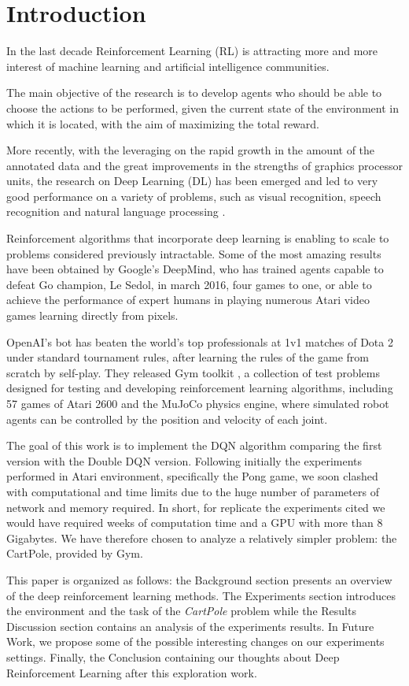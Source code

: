 \section{Introduction}

In the last decade Reinforcement Learning (RL) is attracting more and more interest of machine learning and artificial intelligence communities.

The main objective of the research is to develop agents who should be able to choose the actions to be performed, given the current state of the environment in which it is located, with the aim of maximizing the total reward.

More recently, with the leveraging on the rapid growth in the amount of the annotated data and the great improvements in the strengths of graphics processor units, the research on  Deep Learning (DL) has been emerged and led to very good performance on a variety of problems, such as visual recognition, speech recognition and natural language processing \cite{AdvancesCNN}.

Reinforcement algorithms that incorporate deep learning is enabling to scale to problems considered previously intractable. Some of the most amazing results have been obtained by Google’s DeepMind, who has trained agents capable to defeat Go champion, Le Sedol, in march 2016, four games to one, or able to achieve the performance of expert humans in playing numerous Atari video games learning directly from pixels.

OpenAI's bot has beaten the world's top professionals at 1v1 matches of Dota 2 under standard tournament rules, after learning the rules of the game from scratch by self-play.
They released Gym toolkit \cite{Gym}, a collection of test problems designed for testing and developing reinforcement learning algorithms, including 57 games of Atari 2600 and the MuJoCo physics engine, where simulated robot agents can be controlled by the position and velocity of each joint. 

The goal of this work is to implement the DQN algorithm comparing the first version with the Double DQN version. Following initially the experiments performed in Atari environment, specifically the Pong game, we soon clashed with computational and time limits due to the huge number of parameters of network and memory required. In short, for replicate the experiments cited we would have required weeks of computation time and a GPU with more than 8 Gigabytes. We have therefore chosen to analyze a relatively simpler problem: the CartPole, provided by Gym.

This paper is organized as follows: the Background section presents an overview of the deep reinforcement learning methods. The Experiments section introduces the environment and the task of the \textit{CartPole} problem while the Results Discussion section contains an analysis of the experiments results. In Future Work, we propose some of the possible interesting changes on our experiments settings. Finally, the Conclusion containing our thoughts about Deep Reinforcement Learning after this exploration work.
